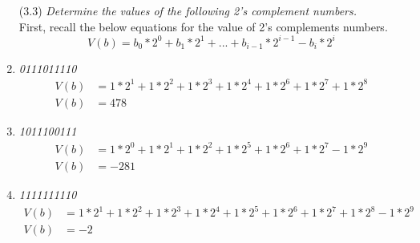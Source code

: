 \documentclass[12pt]{article}
\begin{document}
\begin{enumerate}
\begin{enumerate}
          \vspace{10mm}
	      	\item[(3.3)] \textit{Determine the values of the following 2's complement numbers.} \\
                First, recall the below equations for the value of 2's complements numbers.
                \[
                V(b) = b_0 * 2^0 + b_1 * 2^1 + ... + b_{i-1} * 2^{i-1} - b_i * 2^i
                \]
            \setcounter{enumii}{0}
            \item \textit{0111011110}
              \begin{align*}
                V(b) &= 1*2^1 + 1*2^2 + 1*2^3 + 1*2^4 + 1*2^6 + 1*2^7 + 1*2^8 \\
                V(b) &= \boxed{478}
              \end{align*}
            \item \textit{1011100111}
              \begin{align*}
                V(b) &= 1*2^0 + 1*2^1 + 1*2^2 + 1*2^5 + 1*2^6 + 1*2^7 - 1*2^9 \\
                V(b) &= \boxed{-281}
              \end{align*}

            \item \textit{1111111110}
              \begin{align*}
                V(b) &= 1*2^1 + 1*2^2 + 1*2^3 + 1*2^4 + 1*2^5 + 1*2^6 + 1*2^7 + 1*2^8 - 1*2^9 \\
                V(b) &= \boxed{-2}
              \end{align*}


\end{enumerate}
\end{enumerate}
\end{document}
